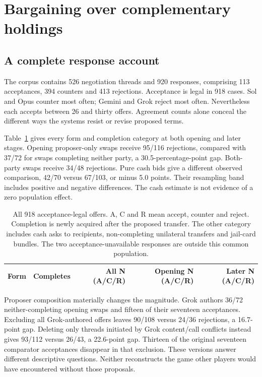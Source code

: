 \section{Bargaining over complementary holdings}
\label{sec:bargain}
\subsection{A complete response account}
The corpus contains 526 negotiation threads and 920 responses, comprising 113 acceptances, 394 counters and 413 rejections. Acceptance is legal in 918 cases. Sol and Opus counter most often; Gemini and Grok reject most often. Nevertheless each accepts between 26 and thirty offers. Agreement counts alone conceal the different ways the systems resist or revise proposed terms.

Table~\ref{tab:full} gives every form and completion category at both opening and later stages. Opening proposer-only swaps receive 95/116 rejections, compared with 37/72 for swaps completing neither party, a 30.5-percentage-point gap. Both-party swaps receive 34/48 rejections. Pure cash bids give a different observed comparison, 42/70 versus 67/103, or minus 5.0 points. Their resampling band includes positive and negative differences. The cash estimate is not evidence of a zero population effect.

\begin{table}[t]\centering\small
\begin{tabular}{@{}llrrr@{}}\toprule
Form & Completes & All N (A/C/R) & Opening N (A/C/R) & Later N (A/C/R)\\\midrule

\end{tabular}
\caption{All 918 acceptance-legal offers. A, C and R mean accept, counter and reject. Completion is newly acquired after the proposed transfer. The other category includes cash asks to recipients, non-completing unilateral transfers and jail-card bundles. The two acceptance-unavailable responses are outside this common population.}\label{tab:full}
\end{table}

Proposer composition materially changes the magnitude. Grok authors 36/72 neither-completing opening swaps and fifteen of their seventeen acceptances. Excluding all Grok-authored offers leaves 90/108 versus 24/36 rejections, a 16.7-point gap. Deleting only threads initiated by Grok content/call conflicts instead gives 93/112 versus 26/43, a 22.6-point gap. Thirteen of the original seventeen comparator acceptances disappear in that exclusion. These versions answer different descriptive questions. Neither reconstructs the game other players would have encountered without those proposals.


